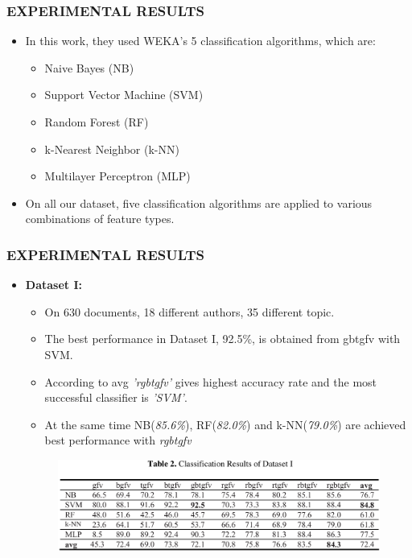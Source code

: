 \documentclass{beamer}
\begin{document}
 \begin{frame}
  \frametitle{EXPERIMENTAL RESULTS}
  \begin{itemize}
   \item In this work, they used WEKA's 5 classification algorithms, which are:
   \begin{itemize}
   \item Naive Bayes (NB)
   \item Support Vector Machine (SVM)
   \item Random Forest (RF)
   \item k-Nearest Neighbor (k-NN)
   \item Multilayer Perceptron (MLP)
   \end{itemize}
	\item On all our dataset, five classification algorithms are applied to various combinations of feature types.
  \end{itemize}
 \end{frame}
 
  \begin{frame}
  \frametitle{EXPERIMENTAL RESULTS}
  \begin{itemize}
   \item \textbf{Dataset I:} 
	\begin{itemize}
	\item On 630 documents, 18 different authors, 35 different topic.
	\item The best performance in Dataset I, 92.5\%, is obtained from gbtgfv with SVM. 
	\item According to avg \textit{'rgbtgfv'} gives highest accuracy rate and the most successful classifier is \textit{'SVM'}. 
	\item At the same time NB(\emph{85.6\%}), RF(\emph{82.0\%}) and k-NN(\emph{79.0\%}) are achieved best performance with \textit{rgbtgfv}
	\end{itemize}
	
	  \begin{figure}[h]
    \begin{center}
      \includegraphics[scale=0.22]{table_2.png}
    \end{center}
   \end{figure}
  
  \end{itemize}
 \end{frame}
 
\end{document}
